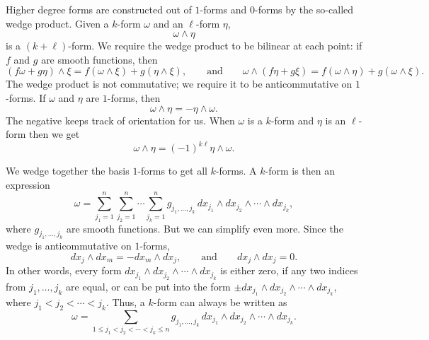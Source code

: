 \documentclass[12pt,openany]{book}
\theoremstyle{plain}
\theoremstyle{remark}
\theoremstyle{definition}
\theoremstyle{exercise}
\theoremstyle{example}
\begin{document}
Higher degree forms are constructed out of $1$-forms and $0$-forms
by the so-called wedge product.  Given a $k$-form $\omega$
and an $\ell$-form $\eta$,
%
\begin{equation*}
\omega \wedge \eta
\end{equation*}
is a $(k+\ell)$-form.  We require the wedge product to be bilinear at each point:
if $f$ and $g$ are smooth functions, then
\begin{equation*}
(f \omega + g \eta) \wedge \xi =
f (\omega \wedge \xi) + g (\eta \wedge \xi)
, \qquad
\text{and}
\qquad
\omega \wedge (f \eta + g \xi) = 
f (\omega \wedge \eta ) +
g ( \omega \wedge \xi) . 
\end{equation*}
The wedge product is not commutative; we require it to be 
anticommutative on $1$-forms. If $\omega$ and $\eta$ are $1$-forms,
then
\begin{equation*}
\omega \wedge \eta = - \eta \wedge \omega .
\end{equation*}
The negative keeps track of orientation for us.
When $\omega$ is a $k$-form and $\eta$ is an $\ell$-form then
we get
\begin{equation*}
\omega \wedge \eta = {(-1)}^{k\ell} \eta \wedge \omega .
\end{equation*}

We wedge together the basis $1$-forms to
get all $k$-forms.
A $k$-form is then an expression
\begin{equation*}
\omega =
\sum_{j_1=1}^n
\sum_{j_2=1}^n
\cdots
\sum_{j_k=1}^n
g_{j_1,\ldots,j_k}
\,
dx_{j_1} \wedge
dx_{j_2} \wedge
\cdots \wedge
dx_{j_k}  ,
\end{equation*}
where $g_{j_1,\ldots,j_k}$ are smooth functions.
But we can simplify even more.  Since the wedge
is anticommutative on $1$-forms,
\begin{equation*}
dx_j \wedge dx_m = 
-dx_m \wedge dx_j
,
\qquad
\text{and}
\qquad
dx_j \wedge dx_j = 0 .
\end{equation*}
In other words,
every form 
$dx_{j_1} \wedge
dx_{j_2} \wedge
\cdots \wedge
dx_{j_k}$ 
is either zero, if any two indices from $j_1,\ldots,j_k$ are equal, or
can be put into the form
$\pm dx_{j_1} \wedge
dx_{j_2} \wedge
\cdots \wedge
dx_{j_k}$, where $j_1 < j_2 < \cdots < j_k$.
Thus, a $k$-form can always be written as
\begin{equation*}
\omega =
\sum_{1 \leq j_1 < j_2 < \cdots < j_k \leq n}
g_{j_1,\ldots,j_k}
\,
dx_{j_1} \wedge
dx_{j_2} \wedge
\cdots \wedge
dx_{j_k}  .
\end{equation*}
\end{document}
